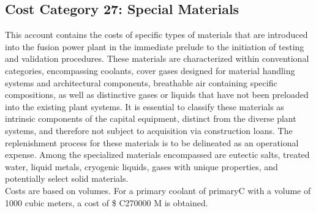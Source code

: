 \subsection{Cost Category 27: Special Materials}

This account contains the costs of specific types of materials that are introduced into the fusion power plant in the immediate prelude to the initiation of 
testing and validation procedures. These materials are characterized within conventional categories, encompassing coolants, cover gases 
designed for material handling systems and architectural components, breathable air containing specific compositions, as well as distinctive 
gases or liquids that have not been preloaded into the existing plant systems. It is essential to classify these materials as intrinsic components of the 
capital equipment, distinct from the diverse plant systems, and therefore not subject to acquisition via construction loans. The replenishment process for 
these materials is to be delineated as an operational expense. Among the specialized materials encompassed are eutectic salts, treated water, liquid metals, 
cryogenic liquids, gases with unique properties, and potentially select solid materials. \\

Costs are based on volumes. For a primary coolant of primaryC with a volume of 1000 cubic meters, a cost of \$ C270000 M is obtained.


